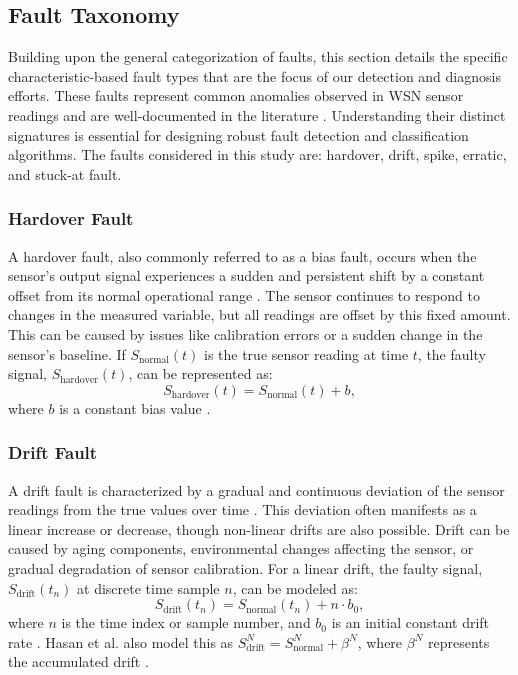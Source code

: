 \subsection{Fault Taxonomy}
\label{subsec:types}
Building upon the general categorization of faults, this section details the specific characteristic-based fault types that are the focus of our detection and diagnosis efforts. These faults represent common anomalies observed in WSN sensor readings and are well-documented in the literature \cite{Saeed2021, Hasan2024, Shi2024, Ni2009}. Understanding their distinct signatures is essential for designing robust fault detection and classification algorithms. The faults considered in this study are: hardover, drift, spike, erratic, and stuck-at fault.

\subsubsection{Hardover Fault}
A hardover fault, also commonly referred to as a bias fault, occurs when the sensor's output signal experiences a sudden and persistent shift by a constant offset from its normal operational range \cite{Saeed2021, Shi2024, Hasan2024}. The sensor continues to respond to changes in the measured variable, but all readings are offset by this fixed amount. This can be caused by issues like calibration errors or a sudden change in the sensor's baseline. If \(S_\text{normal}(t)\) is the true sensor reading at time \(t\), the faulty signal, \(S_\text{hardover}(t)\), can be represented as:
\begin{equation}
S_\text{hardover}(t) = S_\text{normal}(t) + b,
\label{eq:hardover}
\end{equation}
where \(b\) is a constant bias value \cite{Saeed2021}.

\subsubsection{Drift Fault}
A drift fault is characterized by a gradual and continuous deviation of the sensor readings from the true values over time \cite{Saeed2021, Hasan2024}. This deviation often manifests as a linear increase or decrease, though non-linear drifts are also possible. Drift can be caused by aging components, environmental changes affecting the sensor, or gradual degradation of sensor calibration. For a linear drift, the faulty signal, \(S_\text{drift}(t_n)\) at discrete time sample \(n\), can be modeled as:
\begin{equation}
S_\text{drift}(t_n) = S_\text{normal}(t_n) + n \cdot b_0,
\label{eq:drift}
\end{equation}
where \(n\) is the time index or sample number, and \(b_0\) is an initial constant drift rate \cite{Saeed2021}. Hasan et al. also model this as \(S_\text{drift}^N = S_\text{normal}^N +\beta^N\), where \(\beta^N\) represents the accumulated drift \cite{Hasan2024}.


